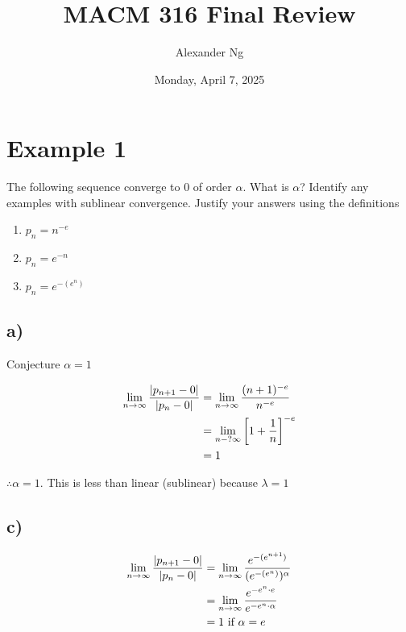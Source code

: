 \documentclass[12pt]{article}
\begin{document}
\title{MACM 316 Final Review}
\author{Alexander Ng}
\date{Monday, April 7, 2025}

\maketitle

\section{Example 1}
The following sequence converge to 0 of order $\alpha$. What is $\alpha$?
Identify any examples with sublinear convergence. Justify your answers using the
definitions
\begin{enumerate}[label=(\alph*)]
  \item $p_n = n^{-e}$
  \item $p_n = e^{-n}$
  \item $p_n=e^{-(e^n)}$
\end{enumerate}

\subsection{a)}
Conjecture $\alpha = 1$

\begin{align*}
  \lim_{n \to \infty} \frac{\abs{p_{n+1}-0}}{\abs{p_n-0}} &= \lim_{n\to\infty}
  \frac{(n+1)^{-e}}{n^{-e}} \\
                                                          &=
                                                          \lim_{n-?\infty}\bqty{1+\frac{1}{n}}^{-e} \\
                                                          &= 1 
\end{align*}

$\therefore \alpha = 1$. This is less than linear (sublinear) because $\lambda =
1$

\subsection{c)}

\begin{align*}
  \lim_{n\to\infty} \frac{\abs{p_{n+1}-0}}{\abs{p_n-0}} 
  &= \lim_{n\to\infty}
  \frac{e^{-(e^{n+1})}}{(e^{-(e^n)})^\alpha} \\
  &= \lim_{n\to\infty}\frac{e^{-e^n\cdot e}}{e^{-e^n\cdot \alpha}} \\
  &= 1 \text{ if } \alpha = e 
\end{align*}
\end{document}
